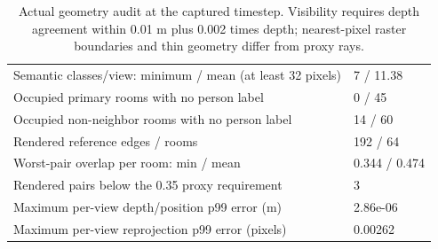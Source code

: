 \begin{table}[ht]
\centering\small
\begin{tabular}{p{.53\linewidth}p{.36\linewidth}}
\toprule
Semantic classes/view: minimum / mean (at least 32 pixels) & 7 / 11.38 \\
Occupied primary rooms with no person label & 0 / 45 \\
Occupied non-neighbor rooms with no person label & 14 / 60 \\
Rendered reference edges / rooms & 192 / 64 \\
Worst-pair overlap per room: min / mean & 0.344 / 0.474 \\
Rendered pairs below the 0.35 proxy requirement & 3 \\
Maximum per-view depth/position p99 error (m) & 2.86e-06 \\
Maximum per-view reprojection p99 error (pixels) & 0.00262 \\
\bottomrule
\end{tabular}
\caption{Actual geometry audit at the captured timestep. Visibility requires depth agreement within 0.01 m plus 0.002 times depth; nearest-pixel raster boundaries and thin geometry differ from proxy rays.}\label{tab:overlap}
\end{table}
